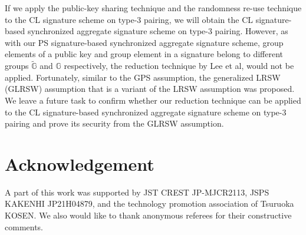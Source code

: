 \documentclass[a4paper,11pt]{fullverllncs}
\newcommand{\G}{\mathbb{G}}
\begin{document}
If we apply the public-key sharing technique and the randomness re-use technique to the CL signature scheme on type-$3$ pairing, we will obtain the CL signature-based synchronized aggregate signature scheme on type-$3$ pairing.
However, as with our PS signature-based synchronized aggregate signature scheme, group elements of a public key and group element in a signature belong to different groups $\widetilde{\G}$ and  $\G$ respectively,  the reduction technique by Lee et al, \cite{LLY13} would not be applied.
Fortunately, similar to the GPS assumption, the generalized LRSW (GLRSW) assumption \cite{CCDLNU17} that is a variant of the LRSW assumption \cite{LRSW99} was proposed.
We leave a future task to confirm whether our reduction technique can be applied to the CL signature-based synchronized aggregate signature scheme on type-$3$ pairing and prove its security from  the GLRSW assumption.

\section*{Acknowledgement}
A part of this work was supported by JST CREST JP-MJCR2113, JSPS KAKENHI JP21H04879, and the technology promotion association of Tsuruoka KOSEN.
We also would like to thank anonymous referees for their constructive comments.




\newpage
\setcounter{tocdepth}{2}
\tableofcontents
\end{document}
